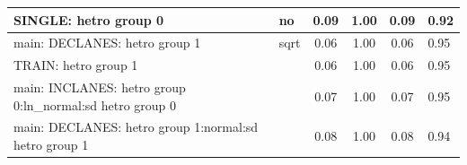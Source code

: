 \begin{table}
\begin{center}
\begin{tabular}{|l|l|c|c|c|l|}
			\hline
			SINGLE: hetro group 0 & no & 0.09 & 1.00 & 0.09 & 0.92 \\
			\hline
			main: DECLANES: hetro group 1 & sqrt & 0.06 & 1.00 & 0.06 & 0.95 \\
			\hline
			TRAIN: hetro group 1 &  & 0.06 & 1.00 & 0.06 & 0.95 \\
			\hline
			main: INCLANES: hetro group 0:ln_normal:sd  hetro group 0 &  & 0.07 & 1.00 & 0.07 & 0.95 \\
			\hline
			main: DECLANES: hetro group 1:normal:sd  hetro group 1 &  & 0.08 & 1.00 & 0.08 & 0.94 \\
			\hline
		\end{tabular}
	\end{center}
\end{table}